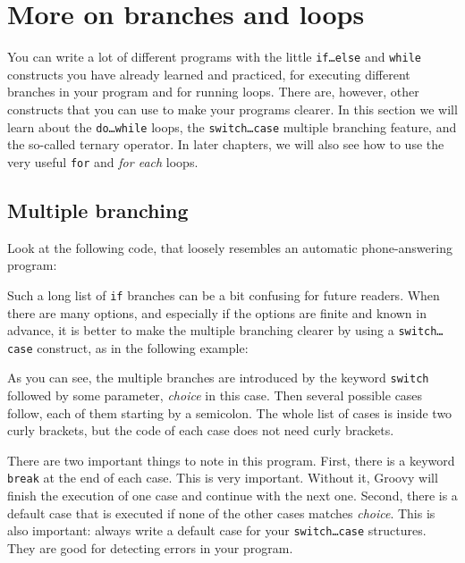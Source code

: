 
\section{More on branches and loops}
\label{sec:more-branches-loops}

You can write a lot of different programs with the little
\texttt{if\ldots else} and \texttt{while} constructs you have already
learned and practiced, for executing different branches in your
program and for running loops. There are, however, other constructs
that you can use to make your programs clearer. In this section we
will learn about the \texttt{do\ldots while} loops, the
\texttt{switch\ldots case} multiple branching feature, and the
so-called ternary operator. In later chapters, we will also see how to
use the very useful \texttt{for} and \emph{for each} loops. 

\subsection{Multiple branching}
\label{sec:multiple-branching}

Look at the following code, that loosely resembles an automatic
phone-answering program:


Such a long list of \texttt{if} branches can be a bit confusing for
future readers. When there are many options, and especially if the
options are finite and known in advance, it is better to make the
multiple branching clearer by using a \texttt{switch\ldots case}
construct, as in the following example:


As you can see, the multiple branches are introduced by the keyword
\texttt{switch} followed by some parameter, \emph{choice} in this
case. Then several possible cases follow, each of them starting by a
semicolon. The whole list of cases is inside two curly brackets, but
the code of each case does not need curly brackets. 

There are two important things to note in this program. First, there
is a keyword \texttt{break} at the end of each case. This is very
important. Without it, Groovy will finish the execution of one case
and continue with the next one. Second, there is a default case that
is executed if none of the other cases matches \emph{choice}. This is
also important: always write a default case for your
\texttt{switch\ldots case} structures. They are good for detecting
errors in your program. 

